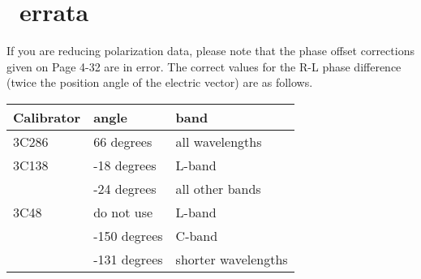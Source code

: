 \section{\Cookbook\ errata}

If you are reducing polarization data, please note that the phase
offset corrections given on Page 4-32 are in error.  The correct
values for the R-L phase difference (twice the position angle of
the electric vector) are as follows.

{\begin{center}
\begin{tabular}{|l|l|l|} \hline\hline
Calibrator & angle & band \\
\hline
	3C286	&	66 degrees    & all wavelengths \\
\hline
	3C138   &      -18 degrees    & L-band \\
                &      -24 degrees    & all other bands \\
\hline
        3C48    &       do not use    & L-band \\
                &       -150 degrees  & C-band \\
                &       -131 degrees  & shorter wavelengths\\
\hline\hline
\end{tabular}
\end{center}}





\vfill\eject
\centerline{\hss{}\hss}
\vfill


